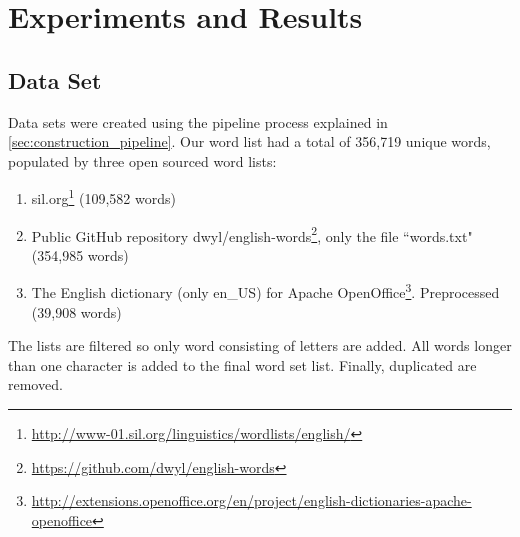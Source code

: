 
\chapter{Experiments and Results}
\label{ch:experiments_and_results}

\section{Data Set}
Data sets were created using the pipeline process explained in \ref{sec:construction_pipeline}. Our word list had a total of 356,719 unique words, populated by three open sourced word lists:

\begin{enumerate}
    \item sil.org\footnote{\url{http://www-01.sil.org/linguistics/wordlists/english/}} (109,582 words)
    \item Public GitHub repository dwyl/english-words\footnote{\url{https://github.com/dwyl/english-words}}, only the file ``words.txt" (354,985 words) 
    \item The English dictionary (only en\_US) for Apache OpenOffice\footnote{\url{http://extensions.openoffice.org/en/project/english-dictionaries-apache-openoffice}}. Preprocessed (39,908 words)
\end{enumerate}

The lists are filtered so only word consisting of letters are added. All words longer than one character is added to the final word set list. Finally, duplicated are removed.